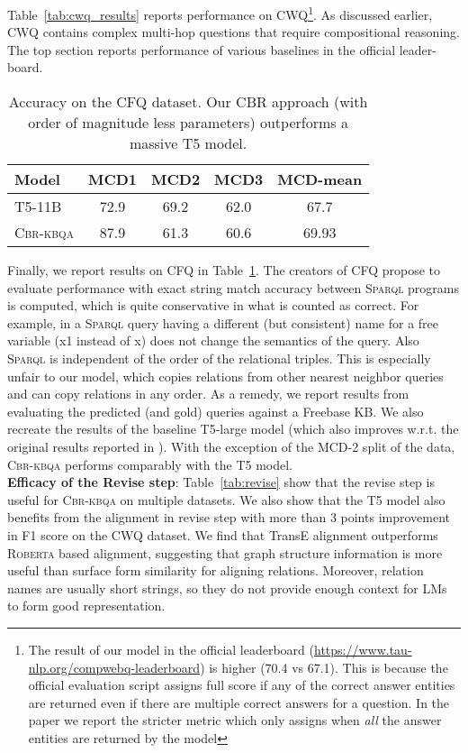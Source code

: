 \documentclass{article}
\newcommand{\roberta}{\textsc{Roberta}\xspace}
\newcommand{\spql}{\textsc{Sparql}\xspace}
\newcommand{\alg}{\textsc{Cbr-kbqa}\xspace}
\begin{document}
Table~\ref{tab:cwq_results} reports performance on CWQ\footnote{The result of our model in the official leaderboard (\url{https://www.tau-nlp.org/compwebq-leaderboard}) is higher (70.4 vs 67.1). This is because the official evaluation script assigns full score if any of the correct answer entities are returned even if there are multiple correct answers for a question. In the paper we report the stricter metric which only assigns when \emph{all} the answer entities are returned by the model}. As discussed earlier, CWQ contains complex multi-hop questions that require compositional reasoning. The top section reports performance of various baselines in the official leader-board.


\begin{table}[t]
    \centering
    \small
    \begin{tabular}{l c c c c}
    \toprule
        Model  & MCD1 & MCD2 & MCD3 & MCD-mean\\\midrule
         T5-11B & 72.9 & 69.2 & 62.0 & 67.7\\
         \alg & 87.9 & 61.3& 60.6 & 69.93\\
    \bottomrule
    \end{tabular}
    \caption{Accuracy on the CFQ dataset. Our CBR approach (with order of magnitude less parameters) outperforms a massive T5 model.}
    \label{tab:my_label}
\end{table}



Finally, we report results on CFQ in Table~\ref{tab:my_label}. The creators of CFQ propose to evaluate performance with exact string match accuracy between \spql programs is computed, which is quite conservative in what is counted as correct. For example, in a \spql query having a different (but consistent) name for a free variable (\textsf{x1} instead of \textsf{x}) does not change the semantics of the query. Also \spql is independent of the order of the relational triples. This is especially unfair to our model, which copies relations from other nearest neighbor queries and can copy relations in any order. As a remedy, we report results from evaluating the predicted (and gold) queries against a Freebase KB. We also recreate the results of the baseline T5-large model (which also improves w.r.t. the original results reported in \cite{furrer2020compositional}). With the exception of the MCD-2 split of the data, \alg performs comparably with the T5 model.\\
\textbf{Efficacy of the Revise step}:
Table~\ref{tab:revise} show that the revise step is useful for \alg on multiple datasets. We also show that the T5 model also benefits from the alignment in revise step with more than 3 points improvement in F1 score on the CWQ dataset. We find that TransE alignment outperforms \roberta based alignment, suggesting that graph structure information is more useful than surface form similarity for aligning relations. Moreover, relation names are usually short strings, so they do not provide enough context for LMs to form good representation.
\end{document}
